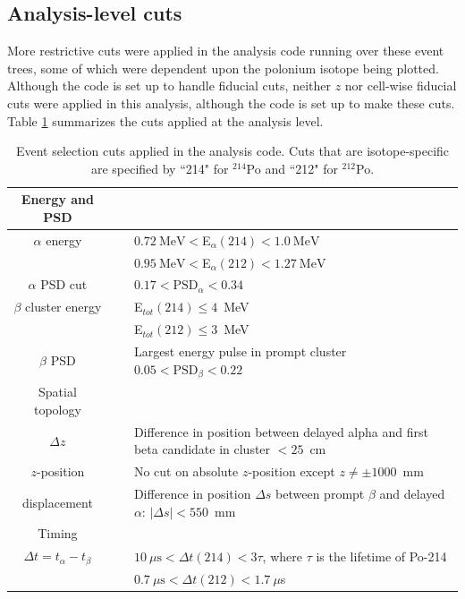 \subsection{Analysis-level cuts}
More restrictive cuts were applied in the analysis code running over these event trees, some of which were dependent upon the polonium isotope being plotted.
Although the code is set up to handle fiducial cuts, neither $z$ nor cell-wise fiducial cuts were applied in this analysis, although the code is set up to make these cuts. Table \ref{tab:analysiscuts} summarizes the cuts applied at the analysis level.
\begin{table}
\begin{center}
\caption{\label{tab:analysiscuts}Event selection cuts applied in the analysis code. Cuts that are isotope-specific are specified by ``214" for $^{214}$Po and ``212" for $^{212}$Po.}
\begin{tabular}[ht]{c c p{10.5cm}}\hline
Energy and PSD&~&~\\\hline\hline
$\alpha$ energy &\vline& $0.72~\textrm{MeV}<$E$_{\alpha}(214)<1.0~\textrm{MeV}$\\
~&\vline&$0.95~\textrm{MeV}<$E$_{\alpha}(212)<1.27~\textrm{MeV}$  \\
$\alpha$ PSD cut& \vline&$0.17<\textrm{PSD}_{\alpha}<0.34$\\
$\beta$ cluster energy &\vline& E$_{tot}(214)\leq 4$~MeV\\~&\vline& E$_{tot}(212)\leq 3$~MeV\\
$\beta$ PSD & \vline&Largest energy pulse in prompt cluster $0.05<\textrm{PSD}_{\beta}<0.22$\\\hline
Spatial topology&~&~\\\hline\hline
$\Delta z$&\vline&Difference in position between delayed alpha and first beta candidate in cluster $<25$~cm\\\hline
$z$-position&\vline& No cut on absolute $z$-position except $z\neq \pm1000$~mm\\\hline
displacement&\vline& Difference in position $\Delta s$ between prompt $\beta$ and delayed $\alpha$: $\left| \Delta s\right|<550$~mm\\\hline
Timing&~&~\\\hline\hline
$\Delta t=t_{\alpha}-t_{\beta}$&\vline &$10~\mu\textrm{s}< \Delta t(214) < 3\tau$, where $\tau$ is the lifetime of Po-214 \\
~&\vline&$0.7~\mu\textrm{s}< \Delta t(212) < 1.7~\mu$s\\\hline

\end{tabular}
\end{center}
\end{table}

